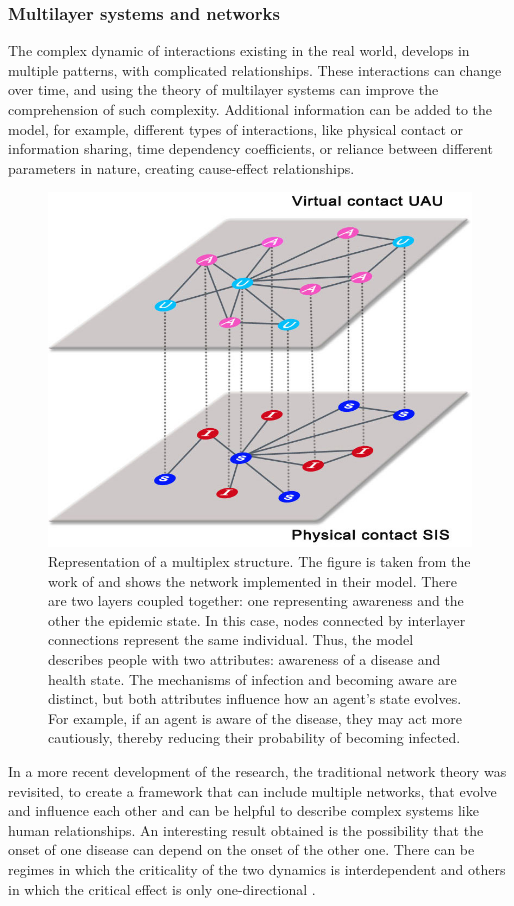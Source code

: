 \subsubsection{Multilayer systems and networks} 
The complex dynamic of interactions existing in the real world, develops in multiple patterns, with complicated relationships. These interactions can change over time, and using the theory of multilayer systems can improve the comprehension of such complexity. Additional information can be added to the model, for example, different types of interactions, like physical contact or information sharing, time dependency coefficients, or reliance between different parameters in nature, creating cause-effect relationships.
\begin{figure}[ht]
	\centering
	\includegraphics[width=0.5\linewidth]{0_introduction/images_introduction/multi_layer}
	\caption[Multi-layer network]{Representation of a multiplex structure. The figure is taken from the work of \cite{Granell2013} and shows the network implemented in their model. There are two layers coupled together: one representing awareness and the other the epidemic state. In this case, nodes connected by interlayer connections represent the same individual. Thus, the model describes people with two attributes: awareness of a disease and health state. The mechanisms of infection and becoming aware are distinct, but both attributes influence how an agent's state evolves. For example, if an agent is aware of the disease, they may act more cautiously, thereby reducing their probability of becoming infected.}
	\label{fig:multilayer}
\end{figure} 
In a more recent development of the research, the traditional network theory was revisited, to create a framework that can include multiple networks, that evolve and influence each other \cite{DeDomenico2016, Krickel_2023} and can be helpful to describe complex systems like human relationships. An interesting result obtained is the possibility that the onset of one disease can depend on the onset of the other one. There can be regimes in which the criticality of the two dynamics is interdependent and others in which the critical effect is only one-directional \cite{DeDomenico2016}. 
